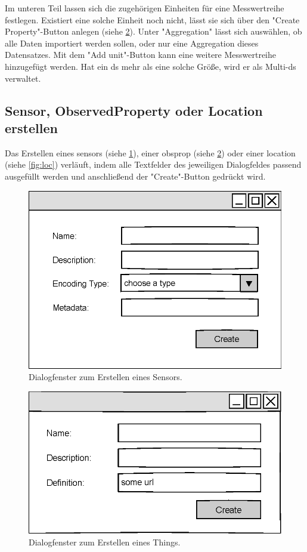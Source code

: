 \documentclass[a4paper, 12 pt]{article}
\begin{document}
Im unteren Teil lassen sich die zugehörigen Einheiten für eine Messwertreihe festlegen. Existiert eine solche Einheit noch nicht, lässt sie sich über den "{Create Property}"{-Button} anlegen (siehe \cref{fig:oprop}). Unter "Aggregation" lässt sich auswählen, ob alle Daten importiert werden sollen, oder nur eine Aggregation dieses Datensatzes. Mit dem "{Add unit}"{-Button} kann eine weitere Messwertreihe hinzugefügt werden. Hat ein \gls{ds} mehr als eine solche Größe, wird er als Multi-\gls{ds} verwaltet.



\subsection{Sensor, ObservedProperty oder Location erstellen}
Das Erstellen eines \gls{sensor}s (siehe \cref{fig:sensor}), einer \gls{obsprop} (siehe \cref{fig:oprop}) oder einer \gls{location} (siehe \cref{fig:loc}) verläuft, indem alle Textfelder des jeweiligen Dialogfeldes passend ausgefüllt werden und anschließend der "{Create}"{-Button} gedrückt wird.

\begin{figure}[htbp]
\centering
\includegraphics[scale=1]{images/sensor}
\caption{\label{fig:sensor}Dialogfenster zum Erstellen eines Sensors.}
\end{figure}

\begin{figure}[htbp]
\centering
\includegraphics[scale=1]{images/oprop}
\caption{\label{fig:oprop}Dialogfenster zum Erstellen eines Things.}
\end{figure}
\end{document}
